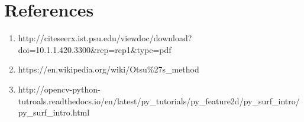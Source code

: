 \documentclass[a4paper]{article}
\begin{document}
\section*{References}

\begin{enumerate}
\item http://citeseerx.ist.psu.edu/viewdoc/download?doi=10.1.1.420.3300\&rep=rep1\&type=pdf
\item https://en.wikipedia.org/wiki/Otsu\%27s\_method
\item http://opencv-python-tutroals.readthedocs.io/en/latest/py\_tutorials/py\_feature2d/py\_surf\_intro/py\_surf\_intro.html
\end{enumerate}

\vspace{-4em}
\end{document}
